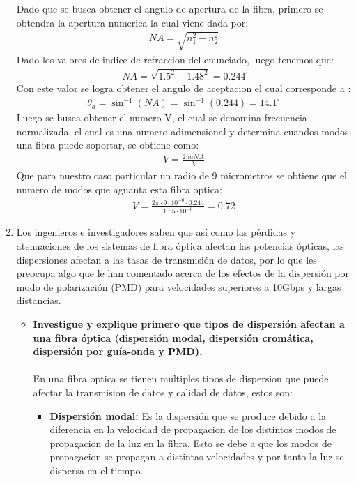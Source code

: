 \begin{enumerate}
Dado que se busca obtener el angulo de apertura de la fibra, primero se obtendra la apertura numerica la cual viene dada por:
\begin{align}
	NA = \sqrt{n_{1}^{2} - n_{2}^{2}}
\end{align}
Dado los valores de indice de refraccion del enunciado, luego tenemos que:
\begin{align}
	NA = \sqrt{1.5^{2} - 1.48^{2}} = 0.244
\end{align}
Con este valor se logra obtener el angulo de aceptacion el cual corresponde a :
\begin{align}
	\theta_{a} = \sin^{-1}(NA) = \sin^{-1}(0.244) = 14.1^{\circ}
\end{align}
Luego se busca obtener el numero V, el cual se denomina frecuencia normalizada, el cual es una numero adimensional y determina cuandos modos una fibra puede soportar, se obtiene como:
\begin{align}
	V = \frac{2\pi a NA}{\lambda}
\end{align}
Que para nuestro caso particular un radio de 9 micrometros se obtiene que el numero de modos que aguanta esta fibra optica:
\begin{align}
	V = \frac{2\pi \cdot 9 \cdot 10^{-6} \cdot 0.244}{1.55 \cdot 10^{-6}} = 0.72
\end{align}
\item Los ingenieros e investigadores saben que así como las pérdidas y atenuaciones de los sistemas de fibra óptica afectan las potencias ópticas, las dispersiones afectan a las tasas de transmisión de datos, por lo que les preocupa algo que le han comentado acerca de los efectos de la dispersión por modo de polarización (PMD) para velocidades superiores a 10Gbps y largas distancias.
\begin{itemize}
	\item \textbf{Investigue y explique primero que tipos de dispersión afectan a una fibra
	óptica (dispersión modal, dispersión cromática, dispersión por guía-onda y PMD).}\\\\
	En una fibra optica se tienen multiples tipos de dispersion que puede afectar la transmision de datos y calidad de datos, estos son:
	\begin{itemize}
		\item \textbf{Dispersión modal:} Es la dispersión que se produce debido a la diferencia en la velocidad de propagacion de los distintos modos de propagacion de la luz en la fibra. Esto se debe a que los modos de propagacion se propagan a distintas velocidades y por tanto la luz se dispersa en el tiempo.\\

\end{itemize}
\end{itemize}
\end{enumerate}
